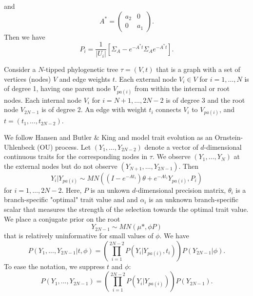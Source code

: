 \documentclass[12pt]{article}
\begin{document}
and 
\begin{equation*}
A^* = \left( \begin{array}{cc}
a_2 & 0  \\
0 & a_1  \end{array} \right) .
\end{equation*}
Then we have
\begin{equation*}
P_i = \frac{1}{|U_i|} \left[ \Sigma_A - e^{-A^*t} \Sigma_A e^{-A^*t}  \right] .
\end{equation*}


Consider a $N$-tipped phylogenetic tree $\tau = (V,t)$ that is a graph with a set of vertices (nodes)
$V$ and edge weights $t$.  Each external node $V_i \in V$ for $i = 1, \dots , N$ is of degree 1, having one
parent node $V_{pa(i)}$ from within the internal or root nodes.  Each internal node $V_i$ for $i = N+1, \dots , 2N-2$ 
is of degree 3 and the root node $V_{2N-1}$ is of degree 2.  An edge with weight $t_i$ connects $V_i$ to
$V_{pa(i)}$, and $t = (t_1, \dots, t_{2N-2})$.
\par
We follow Hansen and Butler $\&$ King and model trait evolution as an Ornstein-Uhlenbeck (OU) process.
Let $(Y_1,\dots,Y_{2N-2})$ denote a vector of $d$-dimensional continuous traits for the corresponding 
nodes in $\tau$.  We observe $(Y_1,\dots,Y_N)$ at the external nodes but do not observe $(Y_{N+1},\dots,Y_{2N-1})$.
Then
\begin{equation}
Y_i | Y_{pa(i)} \sim MN \left(( I - e^{-At_i} ) \theta + e^{-At_i}Y_{pa(i)},  P_i \right) 
\end{equation}
for $i = 1, \dots, 2N-2$.  Here, $P$ is an unkown $d$-dimensional precision matrix, 
$\theta_i$ is a branch-specific "optimal" trait value and 
and $\alpha_i$ is an 
unknown branch-specific scalar that measures the strength of the selection towards the
optimal trait value. 
We place a conjugate prior on the root 
\begin{equation}
Y_{2N-1} \sim MN \left(\mu*, \phi P \right)
\end{equation}
that is relatively uninformative for small values of $\phi$.  We have
\begin{equation}
P(Y_1,...,Y_{2N-1} |t,\phi ) = \left(  \prod_{i=1}^{2N-2} P(Y_i | Y_{pa(i)},t_i) \right) P(Y_{2N-1} | \phi).
\end{equation}
To ease the notation, we suppress $t$ and $\phi$:
\begin{equation}
P(Y_1,...,Y_{2N-1}) = \left(  \prod_{i=1}^{2N-2} P(Y_i | Y_{pa(i)}) \right) P(Y_{2N-1} ).
\end{equation}
\end{document}

